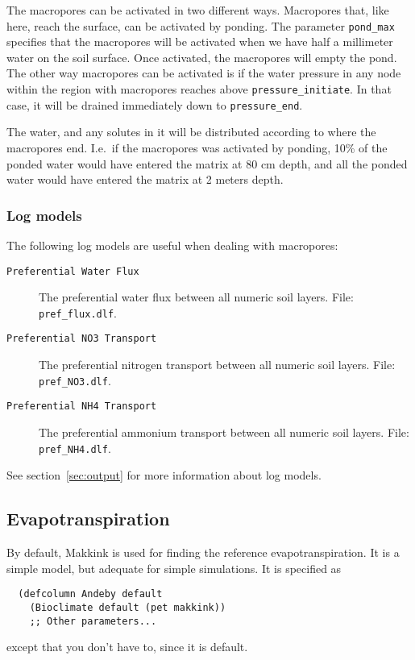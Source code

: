 \documentclass[a4paper,11pt]{article}
\begin{document}
The macropores can be activated in two different ways.  Macropores
that, like here, reach the surface, can be activated by ponding.  The
parameter \texttt{pond\_max} specifies that the macropores will be
activated when we have half a millimeter water on the soil surface.
Once activated, the macropores will empty the pond.  The other way
macropores can be activated is if the water pressure in any node
within the region with macropores reaches above
\texttt{pressure\_initiate}.  In that case, it will be drained
immediately down to \texttt{pressure\_end}.

The water, and any solutes in it will be distributed according to
where the macropores end.  I.e.\ if the macropores was activated by
ponding, 10\% of the ponded water would have entered the matrix at 80
cm depth, and all the ponded water would have entered the matrix at 2
meters depth.

\subsubsection{Log models}

The following log models are useful when dealing with macropores:
\begin{description}
\item[\texttt{Preferential Water Flux}] The preferential water flux
  between all numeric soil layers.  File: \texttt{pref\_flux.dlf}.
\item[\texttt{Preferential NO3 Transport}] The preferential nitrogen
  transport between all numeric soil layers.  File:
  \texttt{pref\_NO3.dlf}.
\item[\texttt{Preferential NH4 Transport}] The preferential ammonium
  transport between all numeric soil layers.  File:
  \texttt{pref\_NH4.dlf}.
\end{description}
See section~\ref{sec:output} for more information about log models. 

\subsection{Evapotranspiration}
\label{sec:bioclimate}

By default, Makkink is used for finding the reference
evapotranspiration.  It is a simple model, but adequate for simple
simulations.  It is specified as
\begin{verbatim}
  (defcolumn Andeby default
    (Bioclimate default (pet makkink))
    ;; Other parameters...
\end{verbatim}
except that you don't have to, since it is default.
\end{document}
